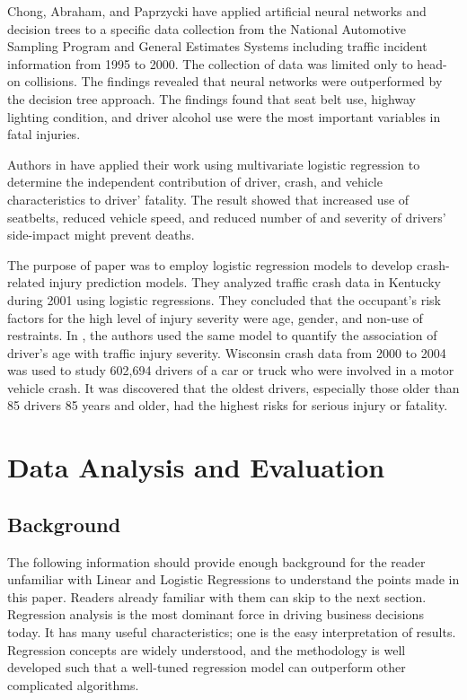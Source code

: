 \documentclass[conference]{IEEEtran}
\begin{document}
Chong, Abraham, and Paprzycki \cite{chong2004traffic} have applied artificial neural networks and decision trees to a specific data collection from the National Automotive Sampling Program and General Estimates Systems including traffic incident information from 1995 to 2000. The collection of data was limited only to head-on collisions. The findings revealed that neural networks were outperformed by the decision tree approach. The findings found that seat belt use, highway lighting condition, and driver alcohol use were the most important variables in fatal injuries.

Authors in \cite{Bedard} have applied their work using multivariate logistic regression to determine the independent contribution of driver, crash, and vehicle characteristics to driver' fatality. The result showed that increased use of seatbelts, reduced vehicle speed, and reduced number of and severity of drivers' side-impact might prevent deaths.

The purpose of paper \cite{SingletonFactors} was to employ logistic regression models to develop crash-related injury prediction models. They analyzed traffic crash data in Kentucky during 2001 using logistic regressions. They concluded that the occupant’s risk factors for the high level of injury severity were age, gender, and non-use of restraints. In \cite{ associationHanrahan}, the authors used the same model to quantify the association of driver’s age with traffic injury severity. Wisconsin crash data from 2000 to 2004 was used to study 602,694 drivers of a car or truck who were involved in a motor vehicle crash. It was discovered that the oldest drivers, especially those older than 85 drivers 85 years and older, had the highest risks for serious injury or fatality.


\section{Data Analysis and Evaluation}
\subsection{Background}
The following information should provide enough background for the reader unfamiliar with Linear and Logistic Regressions to understand the points made in this paper. Readers already familiar with them can skip to the next section. Regression analysis is the most dominant force in driving business decisions today. It has many useful characteristics; one is the easy interpretation of results. Regression concepts are widely understood, and the methodology is well developed such that a well-tuned regression model can outperform other complicated algorithms.
\end{document}
